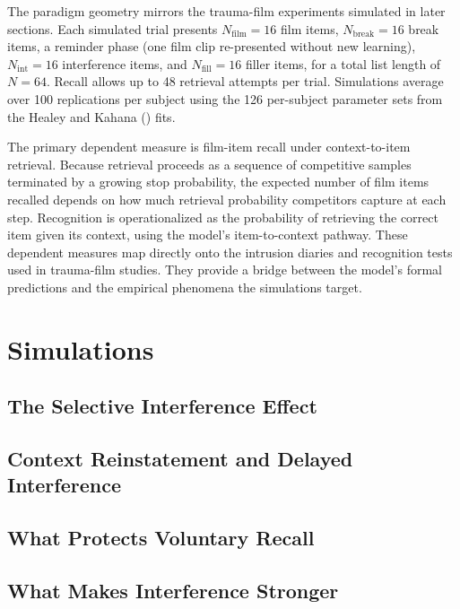 \documentclass[
  man,
  floatsintext,
  longtable,
  nolmodern,
  notxfonts,
  notimes,
  draftfirst,
  colorlinks=true,linkcolor=blue,citecolor=blue,urlcolor=blue]{apa7}
\begin{document}
The paradigm geometry mirrors the trauma-film experiments simulated in
later sections. Each simulated trial presents \(N_\text{film} = 16\)
film items, \(N_\text{break} = 16\) break items, a reminder phase (one
film clip re-presented without new learning), \(N_\text{int} = 16\)
interference items, and \(N_\text{fill} = 16\) filler items, for a total
list length of \(N = 64\). Recall allows up to 48 retrieval attempts per
trial. Simulations average over 100 replications per subject using the
126 per-subject parameter sets from the Healey and Kahana
() fits.

The primary dependent measure is film-item recall under context-to-item
retrieval. Because retrieval proceeds as a sequence of competitive
samples terminated by a growing stop probability, the expected number of
film items recalled depends on how much retrieval probability
competitors capture at each step. Recognition is operationalized as the
probability of retrieving the correct item given its context, using the
model's item-to-context pathway. These dependent measures map directly
onto the intrusion diaries and recognition tests used in trauma-film
studies. They provide a bridge between the model's formal predictions
and the empirical phenomena the simulations target.

\section{Simulations}\label{simulations}

\subsection{The Selective Interference
Effect}\label{the-selective-interference-effect}

\subsection{Context Reinstatement and Delayed
Interference}\label{context-reinstatement-and-delayed-interference}

\subsection{What Protects Voluntary
Recall}\label{what-protects-voluntary-recall}

\subsection{What Makes Interference
Stronger}\label{what-makes-interference-stronger}
\end{document}
